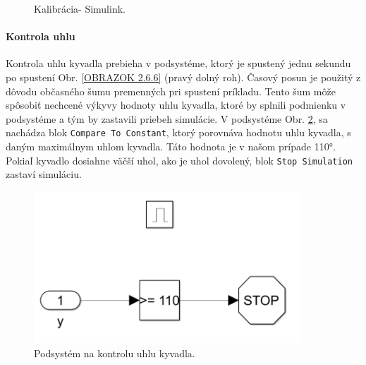 \begin{figure}[!tbh]
	\hfill
	\hfill
	\hfill
	\caption{Kalibrácia- Simulink.}\label{OBRAZOK 2.6.8}
\end{figure}

\paragraph{Kontrola uhlu}

Kontrola uhlu kyvadla prebieha v podsystéme, ktorý je spustený jednu sekundu po spustení Obr. \ref{OBRAZOK 2.6.6} (pravý dolný roh). Časový posun je použitý z dôvodu občasného šumu premenných pri spustení príkladu. Tento šum môže spôsobiť nechcené výkyvy hodnoty uhlu kyvadla, ktoré by splnili podmienku v podsystéme a tým by zastavili priebeh simulácie. V podsystéme Obr. \ref{OBRAZOK 2.6.9}, sa nachádza blok \verb|Compare To Constant|, ktorý porovnáva hodnotu uhlu kyvadla, s daným maximálnym uhlom kyvadla. Táto hodnota je v našom prípade 110°. Pokiaľ kyvadlo dosiahne väčší uhol, ako je uhol dovolený, blok \verb|Stop Simulation| zastaví simuláciu.  

\begin{figure}[!tbh]
	\centering
	\includegraphics[width=100mm]{obr/AngleControl.png}
	\caption{Podsystém na kontrolu uhlu kyvadla.}\label{OBRAZOK 2.6.9}
\end{figure}

